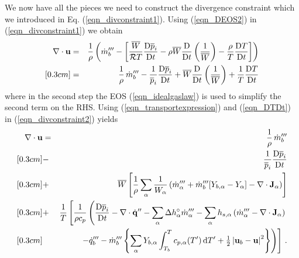 We now have all the pieces we need to construct the divergence constraint which we introduced in Eq. (\ref{eqn_divconstraint1}).  Using (\ref{eqn_DEOS2}) in (\ref{eqn_divconstraint1}) we obtain
\begin{eqnarray}
\label{eqn_divconstraint2}
\nabla\cdot\mathbf{u} &=& \frac{1}{\rho} \left( \dot{m}_b^{{\prime\prime\prime}} -  \left[ \frac{\overline{W}}{\mathcal{R}T} \frac{\mbox{D}\overline{p}_i}{\mbox{D} t} -
\rho \overline{W} \frac{\mbox{D}}{\mbox{D} t}\left(\frac{1}{\overline{W}}\right) - \frac{\rho}{T} \frac{\mbox{D} T}{\mbox{D} t} \right] \right)  \nonumber\\ [0.3cm]
&=& \frac{1}{\rho} \,\dot{m}_b^{\prime\prime\prime} -  \frac{1}{\overline{p}_i} \frac{\mbox{D}\overline{p}_i}{\mbox{D} t} + \overline{W} \frac{\mbox{D}}{\mbox{D} t}\left(\frac{1}{\overline{W}}\right) +
\frac{1}{T} \frac{\mbox{D} T}{\mbox{D} t}
\end{eqnarray}
where in the second step the EOS (\ref{eqn_idealgaslaw}) is used to simplify the second term on the RHS.
Using (\ref{eqn_transportexpression}) and (\ref{eqn_DTDt}) in (\ref{eqn_divconstraint2}) yields
\begin{eqnarray}
\label{eqn_divconstraint3}
\nabla\cdot\mathbf{u} &=& \frac{1}{\rho} \,\dot{m}_b^{{\prime\prime\prime}} \nonumber\\ [0.3cm]
&-& \frac{1}{\overline{p}_i} \frac{\mbox{D}\overline{p}_i}{\mbox{D} t} \nonumber\\ [0.3cm]
&+& \overline{W} \left[\frac{1}{\rho} \sum_\alpha \frac{1}{W_\alpha} \left(  \dot{m}_\alpha^{{\prime\prime\prime}} + \dot{m}_{b}^{{\prime\prime\prime}}[Y_{b,\alpha} - Y_\alpha] - \nabla\cdot \mathbf{J}_{\alpha} \right) \right] \nonumber\\ [0.3cm]
&+& \frac{1}{T} \left[ \frac{1}{\rho c_p} \left( \frac{\mbox{D} \overline{p}_i }{\mbox{D} t} - \nabla\cdot\dot{\mathbf{q}}^{\prime\prime}  - \sum_\alpha \Delta h^\circ_\alpha \dot{m}_\alpha^{{\prime\prime\prime}} - \sum_\alpha h_{s,\alpha}\left(  \dot{m}_\alpha^{{\prime\prime\prime}} - \nabla\cdot \mathbf{J}_{\alpha} \right) \right. \right. \nonumber\\ [0.3cm]
& & \left. \left. \hspace{0.5cm} - \dot{q}_b^{\prime\prime\prime} -\dot{m}_{b}^{{\prime\prime\prime}} \left\{\sum_\alpha Y_{b,\alpha} \int_{T_b}^{T} c_{p,\alpha}(T^\prime) \,\mbox{d}T^\prime  + \mbox{$\frac{1}{2}$}\left|\mathbf{u}_b-\mathbf{u}\right|^2 \right\} \right) \right] \,\mbox{.}
\end{eqnarray}
\vspace{0.3cm}

